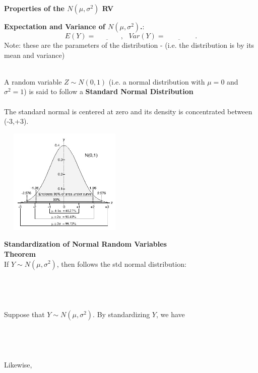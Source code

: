 \textbf{Properties of the $N(\mu,\sigma^2)$ RV}
\bi
\item  \underbar{~~~~~~~~~~~~~~~~~~~~~~~~~~~~~~~~~~~} 
\item  \underbar{~~~~~~~~~~~~~~~~~~~~~~~~~~~~~~~~~~~} 
\item  \underbar{~~~~~~~~~~~~~~~~~~~~~~~~~~~~~~~~~~~} 
\ei
\textbf{Expectation and Variance of $N(\mu,\sigma^2)$.}:\\
$$E(Y) = \underbar{~~~~~~~~~~~~~~~~} , ~~~ Var(Y) = \underbar{~~~~~~~~~~~~~~~~~~~} .$$
Note: these are the parameters of the distribution - (i.e. the distribution is  \underbar{~~~~~~~~~~~~~~~~~~~~~~~~~~~~~~~~~~~~~}  by its mean and variance)
\pagebreak

 \underbar{~~~~~~~~~~~~~~~~~~~~~~~~~~~~~~~~~~~~~~~~~~~~~~~~~~~~~~~~~~~~~~~~~~~~~~~~~~~} \\
A random variable $Z\sim N(0,1)$ (i.e. a normal distribution with $\mu=0$ and $\sigma^2=1$) is said to follow a \textbf{Standard Normal Distribution}\\~\\
The standard normal is centered at zero and its density is concentrated between (-3,+3).
\begin{center}
\vspace{-10pt}
\includegraphics[height=2in,width=2.5in]{stdnormaldistribution.jpg}
\end{center}


\textbf{Standardization of Normal Random Variables}\\
\textbf{Theorem}\\
If $Y \sim N(\mu, \sigma^2)$, then  \underbar{~~~~~~~~~~~~~~~~~~~~~~~~~~~~~~~~~~~}  follows the std normal distribution:\\~\\~\\~\\~\\
Suppose that $Y \sim N(\mu, \sigma^2)$. By standardizing $Y$, we have\\~\\~\\~\\~\\
Likewise,  \underbar{~~~~~~~~~~~~~~~~~~~~~~~~~~~~~~~~~~~~~~~~~~~~~~~~~~~~~~~} \\~\\

